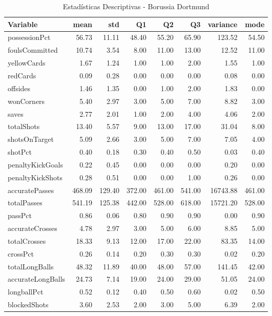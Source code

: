 \begin{table}[H]
\centering
\caption{Estadísticas Descriptivas - Borussia Dortmund}
\label{tab:ger_dortmund}
\small
\begin{tabular}{lrrrrrrr}
\hline
Variable & mean & std & Q1 & Q2 & Q3 & variance & mode \\
\hline
possessionPct & 56.73 & 11.11 & 48.40 & 55.20 & 65.90 & 123.52 & 54.50 \\
foulsCommitted & 10.74 & 3.54 & 8.00 & 11.00 & 13.00 & 12.52 & 11.00 \\
yellowCards & 1.67 & 1.24 & 1.00 & 1.00 & 2.00 & 1.55 & 1.00 \\
redCards & 0.09 & 0.28 & 0.00 & 0.00 & 0.00 & 0.08 & 0.00 \\
offsides & 1.46 & 1.35 & 0.00 & 1.00 & 2.00 & 1.83 & 0.00 \\
wonCorners & 5.40 & 2.97 & 3.00 & 5.00 & 7.00 & 8.82 & 3.00 \\
saves & 2.77 & 2.01 & 1.00 & 2.00 & 4.00 & 4.06 & 2.00 \\
totalShots & 13.40 & 5.57 & 9.00 & 13.00 & 17.00 & 31.04 & 8.00 \\
shotsOnTarget & 5.09 & 2.66 & 3.00 & 5.00 & 7.00 & 7.05 & 4.00 \\
shotPct & 0.40 & 0.18 & 0.30 & 0.40 & 0.50 & 0.03 & 0.40 \\
penaltyKickGoals & 0.22 & 0.45 & 0.00 & 0.00 & 0.00 & 0.20 & 0.00 \\
penaltyKickShots & 0.28 & 0.51 & 0.00 & 0.00 & 1.00 & 0.26 & 0.00 \\
accuratePasses & 468.09 & 129.40 & 372.00 & 461.00 & 541.00 & 16743.88 & 461.00 \\
totalPasses & 541.19 & 125.38 & 442.00 & 528.00 & 618.00 & 15721.20 & 528.00 \\
passPct & 0.86 & 0.06 & 0.80 & 0.90 & 0.90 & 0.00 & 0.90 \\
accurateCrosses & 4.78 & 2.97 & 3.00 & 5.00 & 6.00 & 8.85 & 5.00 \\
totalCrosses & 18.33 & 9.13 & 12.00 & 17.00 & 22.00 & 83.35 & 14.00 \\
crossPct & 0.26 & 0.14 & 0.20 & 0.30 & 0.30 & 0.02 & 0.20 \\
totalLongBalls & 48.32 & 11.89 & 40.00 & 48.00 & 57.00 & 141.45 & 42.00 \\
accurateLongBalls & 24.73 & 7.14 & 19.00 & 24.00 & 29.00 & 51.05 & 24.00 \\
longballPct & 0.52 & 0.12 & 0.40 & 0.50 & 0.60 & 0.02 & 0.50 \\
blockedShots & 3.60 & 2.53 & 2.00 & 3.00 & 5.00 & 6.39 & 2.00 \\

\end{tabular}
\end{table}
